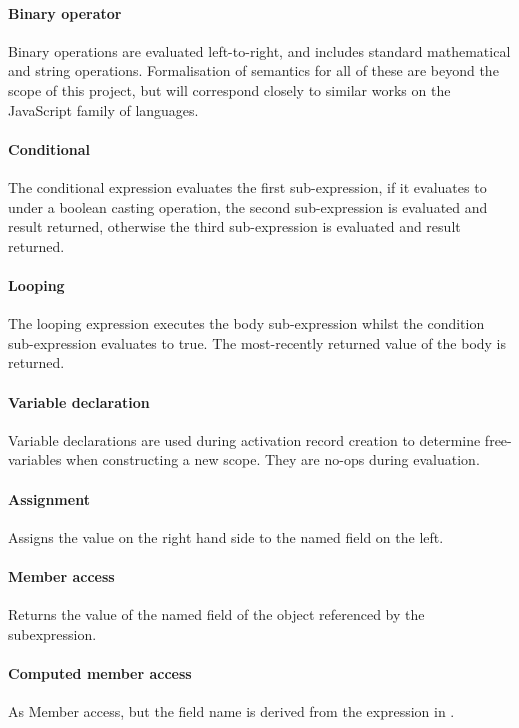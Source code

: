 \documentclass[a4paper]{article}
\begin{document}
\paragraph{Binary operator} Binary operations are evaluated left-to-right, and includes standard
mathematical and string operations. Formalisation of semantics for all of these
are beyond the scope of this project, but will correspond closely to similar
works on the JavaScript family of languages.

\paragraph{Conditional} The conditional expression evaluates the first sub-expression, if it evaluates
to  under a boolean casting operation, the second sub-expression is
evaluated and result returned, otherwise the third sub-expression is evaluated
and result returned.

\paragraph{Looping} The looping expression executes the body sub-expression whilst the condition
sub-expression evaluates to true. The most-recently returned value of the body
is returned.

\paragraph{Variable declaration} Variable declarations are used during activation
record creation
to determine free-variables when constructing a new scope. They are no-ops
during evaluation.

\paragraph{Assignment} Assigns the value on the right hand side to the named field on the
left.

\paragraph{Member access} Returns the value of the named field of the object referenced by
the subexpression.

\paragraph{Computed member access} As Member access, but the field name is derived from
the expression in \js{[]}.
\end{document}
